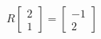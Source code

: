 \documentclass[preview]{standalone}
\begin{document}
\begin{align*}
R\begin{bmatrix} 2 \\ 1 \end{bmatrix} = \begin{bmatrix} -1 \\ 2 \end{bmatrix}
\end{align*}
\end{document}
